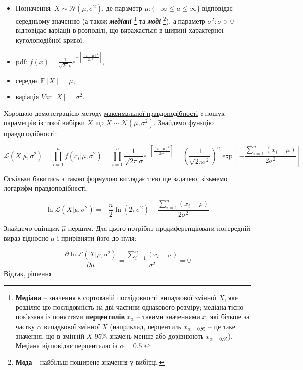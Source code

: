\documentclass[
  11pt,
]{book}
\begin{document}
\begin{itemize}
\item
  Позначення: \(X \sim \mathcal{N}(\mu, \sigma^2)\), де параметр \(\mu: \{-\infty \leq \mu \leq \infty\}\) відповідає середньому значенню (а також \textbf{\emph{медіані}} \footnote{\textbf{Медіана} -- значення в сортованій послідовності випадкової змінної \(X\), яке розділяє цю послідовність на дві частини однакового розміру; медіана тісно пов'язана із поняттями \textbf{перцентилів} \(x_{\alpha}\) -- такими значеннями \(x\), які більше за частку \(\alpha\) випадкової змінної \(X\) (наприклад, перцентиль \(x_{\alpha = 0.95}\) -- це таке значення, що в змінній \(X\) \(95 \%\) значень менше або дорівнюють \(x_{\alpha = 0.95}\)). Медіана відповідає перцентилю із \(\alpha = 0.5\).} та \textbf{\emph{моді}} \footnote{\textbf{Мода} -- найбільш поширене значення у вибірці.}), а параметр \(\sigma^2: \sigma > 0\) відповідає варіації в розподілі, що виражається в ширині характерної куполоподібної кривої.
\item
  pdf: \(f(x) = \frac{1}{\sqrt{2 \pi} \sigma} e^{-\left[ \frac{(x - \mu)^2}{2 \sigma^2} \right]}\),
\item
  середнє \(\mathbb{E} [X] = \mu\),
\item
  варіація \(Var[X] = \sigma^2\).
\end{itemize}

Хорошою демонстрацією методу \hyperref[mle]{максимальної правдоподібності} є пошук параметрів із такої вибірки \(X\) що \(X \sim \mathcal{N}(\mu, \sigma^2)\). Знайдемо функцію правдоподібності:

\[\mathcal{L}(X | \mu, \sigma^2) = \prod \limits_{i=1}^n f(x_i| \mu, \sigma^2) = \prod \limits_{i=1}^n \frac{1}{\sqrt{2 \pi} \sigma} e^{-\left[ \frac{(x - \mu)^2}{2 \sigma^2} \right]} = \left( \frac{1}{\sqrt{2 \pi \sigma^2}} \right)^n \exp \left[ - \frac{\sum \limits_{i=1}^n (x_i - \mu)}{2 \sigma^2} \right]\]

Оскільки бавитись з такою формулою виглядає тією ще задачею, візьмемо логарифм правдоподібності:

\[\ln \mathcal{L}(X | \mu, \sigma^2) = - \frac{n}{2} \ln{(2 \pi \sigma^2)} - \frac{\sum \limits_{i=1}^n (x_i - \mu)}{2 \sigma^2}\]

Знайдемо оцінщик \(\hat{\mu}\) першим. Для цього потрібно продиференціювати попередній вираз відносно \(\mu\) і прирівняти його до нуля:

\[\frac{\partial \ln \mathcal{L}(X | \mu, \sigma^2)}{\partial \mu} = \frac{\sum \limits_{i=1}^n (x_i - \mu)}{\sigma^2} = 0\]
Відтак, рішення
\end{document}
